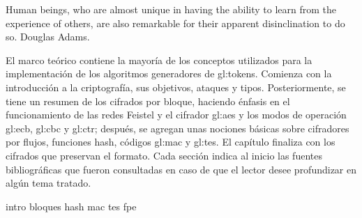 %
%

{
  \epigrafe
  {%
    Human beings, who are almost unique in having the ability to learn from the
    experience of others, are also remarkable for their apparent disinclination
    to do so.%
  }
  {%
     Douglas Adams.%
  }
}

\noindent
El marco teórico contiene la mayoría de los conceptos utilizados para la
implementación de los algoritmos generadores de \glspl{gl:token}. Comienza con
la introducción a la criptografía, sus objetivos, ataques y tipos.
Posteriormente, se tiene un resumen de los cifrados por bloque, haciendo énfasis
en el funcionamiento de las redes Feistel y el cifrador \gls{gl:aes} y los modos
de operación \gls{gl:ecb}, \gls{gl:cbc} y \gls{gl:ctr}; después, se agregan unas
nociones básicas sobre cifradores por flujos, funciones hash, códigos
\gls{gl:mac} y \gls{gl:tes}. El capítulo finaliza con los cifrados que preservan
el formato. Cada sección indica al inicio las fuentes bibliográficas que fueron
consultadas en caso de que el lector desee profundizar en algún tema tratado.

{intro}
{bloques}
{hash}
{mac}
{tes}
{fpe}
